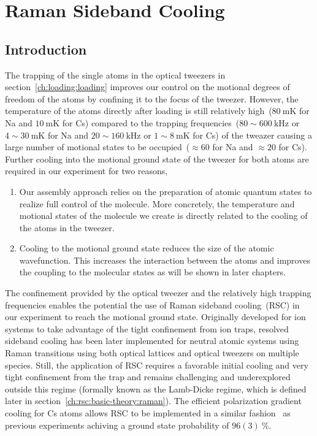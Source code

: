 
\chapter{Raman Sideband Cooling}
\label{ch:rsc}

\section{Introduction}
\label{ch:rsc:introduction}

The trapping of the single atoms in the optical tweezers in section~\ref{ch:loading:loading}
improves our control on the motional degrees of freedom of the atoms
by confining it to the focus of the tweezer.
However, the temperature of the atoms directly after loading
is still relatively high~($80~\mathrm{mK}$ for Na and
$10~\mathrm{mK}$ for Cs)
compared to the trapping frequencies~($80\sim600~\mathrm{kHz}$ or $4\sim30~\mathrm{mK}$ for Na
and $20\sim160~\mathrm{kHz}$ or $1\sim8~\mathrm{mK}$ for Cs)
of the tweazer causing a large number of motional states
to be occupied~($\approx\!60$ for Na and $\approx\!20$ for Cs).
Further cooling into the motional ground state of the tweezer for both atoms
are required in our experiment for two reasons,
\begin{enumerate}
\item Our assembly approach relies on the preparation of atomic quantum states
  to realize full control of the molecule.
  More concretely, the temperature and motional states of the molecule we create
  is directly related to the cooling of the atoms in the tweezer.
\item Cooling to the motional ground state reduces the size of the atomic wavefunction.
  This increases the interaction between the atoms and
  improves the coupling to the molecular states as will be shown in later chapters.
\end{enumerate}

The confinement provided by the optical tweezer and the relatively high trapping frequencies
enables the potential the use of Raman sideband cooling~(RSC)
in our experiment to reach the motional ground state.
Originally developed for ion systems to take advantage of the tight confinement from ion traps,
resolved sideband cooling has been later implemented for neutral atomic systems
using Raman transitions using both optical lattices and optical tweezers
on multiple species. Still, the application of RSC requires a favorable initial cooling
and very tight confinement from the trap and remains challenging and underexplored
outside this regime (formally known as the Lamb-Dicke regime,
which is defined later in section~\ref{ch:rsc:basic-theory:raman}).
The efficient polarization gradient cooling for Cs atoms allows RSC
to be implemented in a similar fashion~\cite{liu_molecular_2019} as previous experiments
achiving a ground state probability of $96(3)~\mathrm{\%}$.

